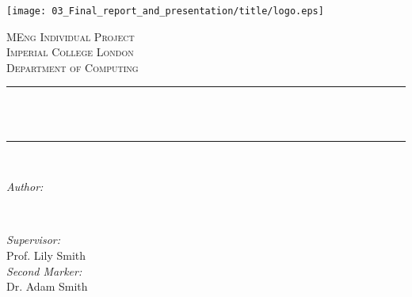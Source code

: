 \begin{titlepage}

  \newcommand{\HRule}{\rule{\linewidth}{0.5mm}} %
  
  
  \texttt{[image: 03\_Final\_report\_and\_presentation/title/logo.eps]}\\[1cm] %
   
  
  \center %
  
  
  \textsc{\LARGE MEng Individual Project}\\[1.5cm] %
  \textsc{\Large Imperial College London}\\[0.5cm] %
  \textsc{\large Department of Computing}\\[0.5cm] %
  
  \makeatletter
  \HRule \\[0.4cm]
  { \huge \bfseries \@title}\\[0.4cm] %
  \HRule \\[1.5cm]
   
  
  \begin{minipage}{0.4\textwidth}
  \begin{flushleft} \large
  \emph{Author:}\\
  \@author %
  \end{flushleft}
  \end{minipage}
  ~
  \begin{minipage}{0.4\textwidth}
  \begin{flushright} \large
  \emph{Supervisor:} \\
  Prof. Lily Smith \\[1.2em] %
  \emph{Second Marker:} \\
  Dr. Adam Smith %
  \end{flushright}
  \end{minipage}\\[2cm]
  \makeatother
  

\end{titlepage}
